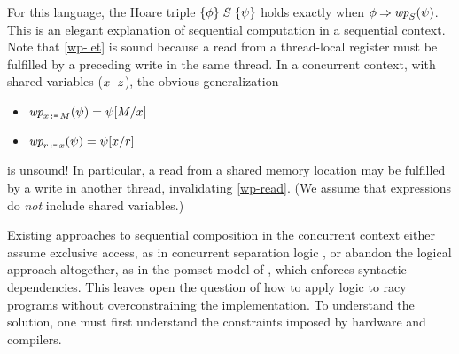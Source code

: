 For this language, the Hoare triple
$\{\phi\}\allowbreak\;S\;\allowbreak\{\psi\}$ holds exactly when $\aForm \limplies
\fwp{\aCmd}{\bForm}$.
This is an elegant explanation of sequential computation in a sequential
context. Note that \ref{wp-let} is sound because a read from a thread-local
register must be fulfilled by a preceding write in the same thread.
In a concurrent context, with shared variables
($x$--$z$), the obvious generalization
\begin{multicols}{2}
\begin{itemize}
\item[{\labeltext[\textsc{d}2b]{(\textsc{d}2b)}{wp-write}}] $\fwp{\LET{\aLoc}{\aExp}}{\bForm} = \bForm[\aExp/\aLoc]$
\item[{\labeltext[\textsc{d}2c]{(\textsc{d}2c)}{wp-read}}] $\fwp{\LET{\aReg}{\aLoc}}{\bForm} = \bForm[\aLoc/\aReg]$
\end{itemize}
\end{multicols}
\noindent
is unsound!  In particular, a read from a shared memory location may be fulfilled by a write
in another thread, invalidating \ref{wp-read}.  (We assume that expressions
do \emph{not} include shared variables.) %

Existing approaches to sequential composition in the concurrent context
either assume exclusive access, as in concurrent separation logic
\cite{OHearn:2007:RCL:1235896.1236121}, or abandon the logical approach
altogether, as in the pomset model of
\citet{DBLP:journals/corr/abs-1804-04214}, which enforces syntactic
dependencies.  This leaves open the question of how to apply logic to racy
programs without overconstraining the implementation.  To understand the
solution, one must first understand the constraints imposed by hardware and
compilers.



